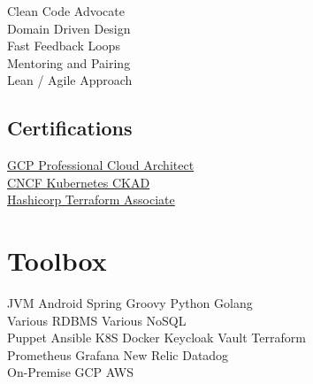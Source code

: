 \documentclass[]{resume}
\begin{document}
\begin{minipage}[t]{0.32\textwidth}
Clean Code Advocate \\
Domain Driven Design \\
Fast Feedback Loops \\
Mentoring and Pairing \\
Lean / Agile Approach \\
\sectionsep

\subsection{Certifications}
\href{https://cloud.google.com/certification/cloud-architect}{GCP Professional Cloud Architect}\\
\href{https://www.cncf.io/certification/cka/}{CNCF Kubernetes CKAD}\\
\href{https://www.hashicorp.com/certification/terraform-associate}{Hashicorp Terraform Associate}\\
\sectionsep


\section{Toolbox}
JVM\textbullet{} Android \textbullet{} Spring \textbullet{} Groovy \textbullet{} Python \textbullet{} Golang \\
Various RDBMS \textbullet{} Various NoSQL\\
Puppet \textbullet{} Ansible \textbullet{} K8S \textbullet{} Docker \textbullet{} Keycloak \textbullet{} Vault \textbullet{} Terraform\\
Prometheus \textbullet{} Grafana \textbullet{} New Relic \textbullet{} Datadog \\
On-Premise \textbullet{} GCP \textbullet{} AWS \\
\sectionsep

%
%

\end{minipage} 
\hfill
\end{document}
